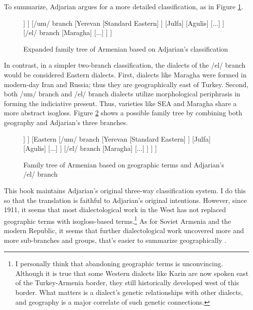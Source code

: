 To summarize, Adjarian argues for a more detailed classification, as in Figure \ref{tree:dialect:adj}. 

\begin{figure}[H]
	\caption{Expanded family tree of Armenian based on Adjarian's classification}
	\label{tree:dialect:adj}
	\centering
	\begin{forest}
		[{Classical Armenian}  [/kə/ branch  [... ] [Trabzon ] [Crimea ] [Istanbul   [{Standard Western}] ] ]  [/um/ branch [Yerevan [{Standard Eastern}] ] [Julfa] [Agulis] [...]   ]  [/el/ branch [Maragha] [...] ] ]
	\end{forest}
	
\end{figure}

In contrast, in a simpler two-branch classification, the dialects of the /el/ branch  would be considered Eastern dialects. First, dialects like Maragha were formed in modern-day Iran and Russia; thus they are geographically east of Turkey. Second,  both /um/ branch and /el/ branch dialects utilize morphological periphrasis in forming the indiciative present. Thus, varieties like SEA and Maragha share a more abstract isogloss. Figure \ref{tree:dialect:compromise} shows a possible family tree by combining both geography and Adjarian's three branches. 

\begin{figure}[H]
	\caption{Family tree of Armenian based on geographic terms and Adjarian's /el/ branch}
	\label{tree:dialect:compromise}
	\centering
	\begin{forest}
		[{Classical Armenian}  [{Western (/kə/ branch)}  [... ] [Trabzon ] [Crimea ] [Istanbul   [{Standard Western}] ] ]  [Eastern  [{/um/ branch} [Yerevan [{Standard Eastern}] ] [Julfa] [Agulis] [...]   ]  [/el/ branch [Maragha] [...] ] ] ]
	\end{forest}
	
\end{figure}
 
This book maintains Adjarian's original three-way classification system. I do this so that the translation is faithful to Adjarian's original intentions. However, since 1911, it seems that most dialectological work in the West has not replaced geographic terms with isogloss-based terms.\footnote{I personally think that abandoning geographic terms is unconvincing. Although it is true that some Western dialects like Karin are now   spoken east of the Turkey-Armenia border, they still historically developed west of this border. What matters is a dialect's genetic relationships with other dialects, and geography is a major correlate of such genetic connections. } As for Soviet Armenia and the modern Republic, it seems that further dialectological work uncovered more and more sub-branches and groups, that's easier to summarize geographically \citep[\S 4]{Martirosyan-2019-Armeniandialects}. 



